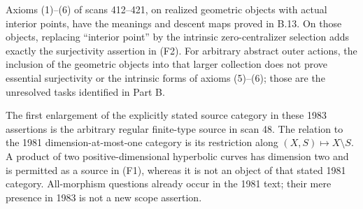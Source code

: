 \begin{proposition}
Axioms (1)--(6) of scans 412--421, on realized geometric
objects with actual interior points, have the meanings and
descent maps proved in B.13. On those objects, replacing
``interior point'' by the intrinsic zero-centralizer selection
adds exactly the surjectivity assertion in (F2). For arbitrary
abstract outer actions, the inclusion of the geometric objects
into that larger collection does not prove essential
surjectivity or the intrinsic forms of axioms (5)--(6);
those are the unresolved tasks identified in Part B.

The first enlargement of the explicitly stated source category
in these 1983 assertions is the arbitrary regular finite-type
source in scan 48. The relation to the 1981 dimension-at-most-one
category is its restriction along
$(X,S)\mapsto X\setminus S$. A product of two positive-dimensional
hyperbolic curves has dimension two and is permitted as a source
in (F1), whereas it is not an object of that stated 1981 category.
All-morphism questions already occur in the 1981 text; their
mere presence in 1983 is not a new scope assertion.
\end{proposition}
